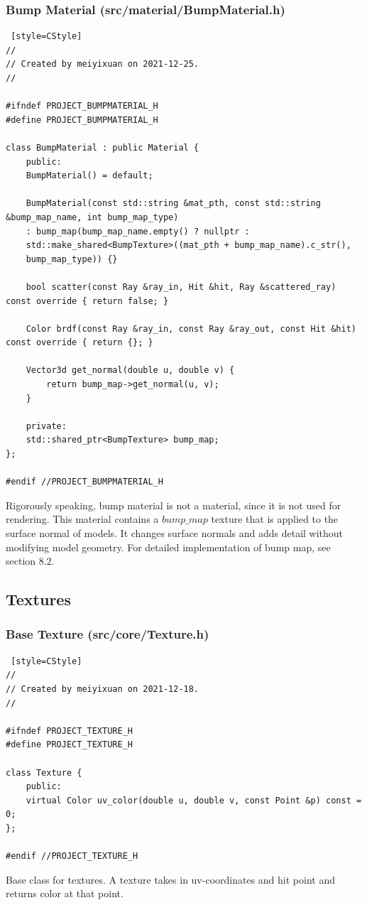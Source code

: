 \documentclass[utf8]{article}
\begin{document}
\subsubsection{Bump Material (src/material/BumpMaterial.h)}
\begin{lstlisting} [style=CStyle]
//
// Created by meiyixuan on 2021-12-25.
//

#ifndef PROJECT_BUMPMATERIAL_H
#define PROJECT_BUMPMATERIAL_H

class BumpMaterial : public Material {
	public:
	BumpMaterial() = default;
	
	BumpMaterial(const std::string &mat_pth, const std::string &bump_map_name, int bump_map_type)
	: bump_map(bump_map_name.empty() ? nullptr :
	std::make_shared<BumpTexture>((mat_pth + bump_map_name).c_str(),
	bump_map_type)) {}
	
	bool scatter(const Ray &ray_in, Hit &hit, Ray &scattered_ray) const override { return false; }
	
	Color brdf(const Ray &ray_in, const Ray &ray_out, const Hit &hit) const override { return {}; }
	
	Vector3d get_normal(double u, double v) {
		return bump_map->get_normal(u, v);
	}
	
	private:
	std::shared_ptr<BumpTexture> bump_map;
};

#endif //PROJECT_BUMPMATERIAL_H

\end{lstlisting}
Rigorously speaking, bump material is not a material, since it is not used for rendering. This material contains a $bump\_map$ texture that is applied to the surface normal of models. It changes surface normals and adds detail without modifying model geometry. For detailed implementation of bump map, see section 8.2.

\subsection{Textures}
\subsubsection{Base Texture (src/core/Texture.h)}
\begin{lstlisting} [style=CStyle]
//
// Created by meiyixuan on 2021-12-18.
//

#ifndef PROJECT_TEXTURE_H
#define PROJECT_TEXTURE_H

class Texture {
	public:
	virtual Color uv_color(double u, double v, const Point &p) const = 0;
};

#endif //PROJECT_TEXTURE_H

\end{lstlisting}
Base class for textures. A texture takes in uv-coordinates and hit point and returns color at that point.
\end{document}
